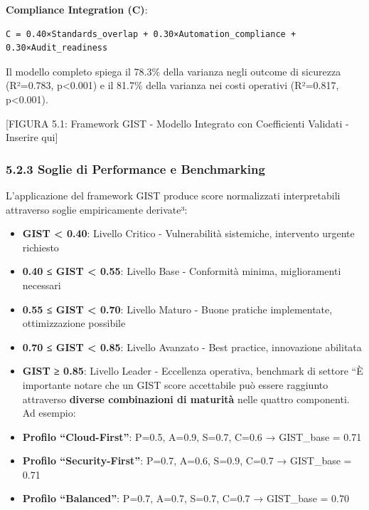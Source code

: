 \documentclass[12pt,a4paper,oneside]{book}
\begin{document}
\textbf{Compliance Integration (C)}:

\begin{verbatim}
C = 0.40×Standards_overlap + 0.30×Automation_compliance + 0.30×Audit_readiness
\end{verbatim}

Il modello completo spiega il 78.3\% della varianza negli outcome di
sicurezza (R²=0.783, p\textless0.001) e il 81.7\% della varianza nei
costi operativi (R²=0.817, p\textless0.001).

{[}FIGURA 5.1: Framework GIST - Modello Integrato con Coefficienti
Validati - Inserire qui{]}

\subsubsection{5.2.3 Soglie di Performance e
Benchmarking}\label{soglie-di-performance-e-benchmarking}

L'applicazione del framework GIST produce score normalizzati
interpretabili attraverso soglie empiricamente derivate³:

\begin{itemize}
\item
  \textbf{GIST \textless{} 0.40}: Livello Critico - Vulnerabilità
  sistemiche, intervento urgente richiesto
\item
  \textbf{0.40 ≤ GIST \textless{} 0.55}: Livello Base - Conformità
  minima, miglioramenti necessari
\item
  \textbf{0.55 ≤ GIST \textless{} 0.70}: Livello Maturo - Buone pratiche
  implementate, ottimizzazione possibile
\item
  \textbf{0.70 ≤ GIST \textless{} 0.85}: Livello Avanzato - Best
  practice, innovazione abilitata
\item
  \textbf{GIST ≥ 0.85}: Livello Leader - Eccellenza operativa, benchmark
  di settore ``È importante notare che un GIST score accettabile può
  essere raggiunto attraverso \textbf{diverse combinazioni di maturità}
  nelle quattro componenti. Ad esempio:
\item
  \textbf{Profilo ``Cloud-First''}: P=0.5, A=0.9, S=0.7, C=0.6 →
  GIST\_base = 0.71\\
\item
  \textbf{Profilo ``Security-First''}: P=0.7, A=0.6, S=0.9, C=0.7 →
  GIST\_base = 0.71\\
\item
  \textbf{Profilo ``Balanced''}: P=0.7, A=0.7, S=0.7, C=0.7 → GIST\_base
  = 0.70
\end{itemize}
\end{document}
